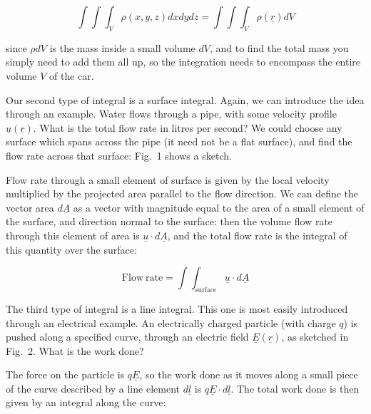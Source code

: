   \begin{equation*}\int{\int{\int_V{\rho(x,y,z) dx}dy}dz} = 
  \int{\int{\int_V{\rho(\underline{r})}}dV} \tag{8}\end{equation*} 

  \noindent{}since $\rho dV$ is the mass inside a small volume $dV$, and to 
  find the total mass you simply need to add them all up, so the integration 
  needs to encompass the entire volume $V$ of the car. 

  Our second type of integral is a surface integral. Again, we can introduce 
  the idea through an example. Water flows through a pipe, with some velocity 
  profile $\underline{u}(\underline{r})$. What is the total flow rate in litres 
  per second? We could choose any surface which spans across the pipe (it need 
  not be a flat surface), and find the flow rate across that surface: Fig.\ 1 
  shows a sketch. 


  Flow rate through a small element of surface is given by the local velocity 
  multiplied by the projected area parallel to the flow direction. We can 
  define the vector area $d\underline{A}$ as a vector with magnitude equal to 
  the area of a small element of the surface, and direction normal to the 
  surface: then the volume flow rate through this element of area is 
  $\underline{u} \cdot d\underline{A}$, and the total flow rate is the integral 
  of this quantity over the surface: 

  \begin{equation*}\mathrm{Flow~rate} = 
  \int{\int_{\mathrm{surface}}{\underline{u} \cdot d\underline{A}}} 
  \tag{9}\end{equation*} 

  The third type of integral is a line integral. This one is most easily 
  introduced through an electrical example. An electrically charged particle 
  (with charge $q$) is pushed along a specified curve, through an electric 
  field $\underline{E}(\underline{r})$, as sketched in Fig.\ 2. What is the 
  work done? 


  The force on the particle is $q\underline{E}$, so the work done as it moves 
  along a small piece of the curve described by a line element $d\underline{l}$ 
  is $q\underline{E} \cdot d\underline{l}$. The total work done is then given 
  by an integral along the curve: 

